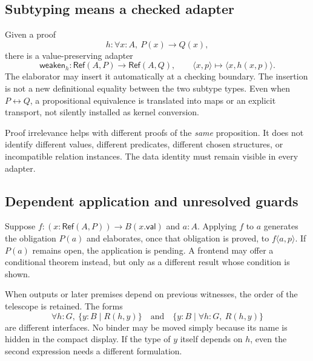 \documentclass[11pt,a4paper]{article}
\newcommand{\Rfn}{\mathsf{Ref}}
\theoremstyle{plain}
\theoremstyle{definition}
\theoremstyle{remark}
\begin{document}
\subsection{Subtyping means a checked adapter}
Given a proof
\[
 h:\forall x:A,\ P(x)\to Q(x),
\]
there is a value-preserving adapter
\[
 \mathsf{weaken}_h:\Rfn(A,P)\to\Rfn(A,Q),\qquad
 \langle x,p\rangle\mapsto\langle x,h(x,p)\rangle.
\]
The elaborator may insert it automatically at a checking boundary. The
insertion is not a new definitional equality between the two subtype types.
Even when $P\leftrightarrow Q$, a propositional equivalence is translated into
maps or an explicit transport, not silently installed as kernel conversion.

Proof irrelevance helps with different proofs of the \emph{same} proposition.
It does not identify different values, different predicates, different chosen
structures, or incompatible relation instances. The data identity must remain
visible in every adapter.

\subsection{Dependent application and unresolved guards}
Suppose $f:(x:\Rfn(A,P))\to B(x.\mathsf{val})$ and $a:A$. Applying $f$ to
$a$ generates the obligation $P(a)$ and elaborates, once that obligation is
proved, to $f\langle a,p\rangle$. If $P(a)$ remains open, the application is
pending. A frontend may offer a conditional theorem instead, but only as a
different result whose condition is shown.

When outputs or later premises depend on previous witnesses, the order of the
telescope is retained. The forms
\[
 \forall h:G,\ \{y:B\mid R(h,y)\}
 \quad\text{and}\quad
 \{y:B\mid\forall h:G,\ R(h,y)\}
\]
are different interfaces. No binder may be moved simply because its name is
hidden in the compact display. If the type of $y$ itself depends on $h$, even
the second expression needs a different formulation.
\end{document}
